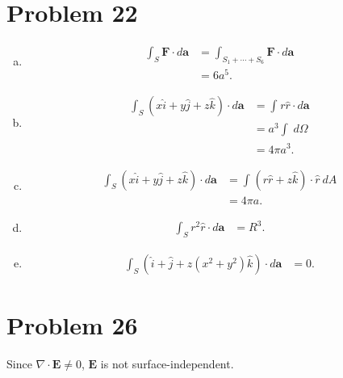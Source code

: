 \documentclass[10pt]{mypackage}
\begin{document}
\section{Problem 22}%
\begin{enumerate}[(a)]
  \item 
    \begin{align*}
      \int_{S}^{} \mathbf{F}\cdot d\mathbf{a} &= \int_{S_1 + \cdots + S_6}^{} \mathbf{F}\cdot d\mathbf{a}\\
                                              &= 6a^5.
    \end{align*}
  \item
    \begin{align*}
      \int_{S}^{} \left(x\hat{i} + y\hat{j} + z\hat{k}\right)\cdot d\mathbf{a} &= \int_{}^{} r\hat{r}\cdot d\mathbf{a}\\
                                                                           &= a^3\int_{}^{} \:d\Omega\\
                                                                           &= 4\pi a^3.
    \end{align*}
  \item 
    \begin{align*}
      \int_{S}^{} \left(x\hat{i} + y\hat{j} + z\hat{k} \right)\cdot d\mathbf{a} &= \int_{}^{} \left(r\hat{r} + z\hat{k}\right)\cdot \hat{r}\:dA\\
                                                                            &= 4\pi a.
    \end{align*}
  \item 
    \begin{align*}
      \int_{S}^{} r^2\hat{r}\cdot d\mathbf{a} &= R^3.
    \end{align*}
  \item 
    \begin{align*}
      \int_{S}^{} \left(\hat{i} + \hat{j} + z\left(x^2 + y^2\right)\hat{k}\right)\cdot d\mathbf{a} &= 0.
    \end{align*}
\end{enumerate}
\section{Problem 26}%
Since $\nabla \cdot \mathbf{E} \neq 0$, $\mathbf{E}$ is not surface-independent.
\end{document}
